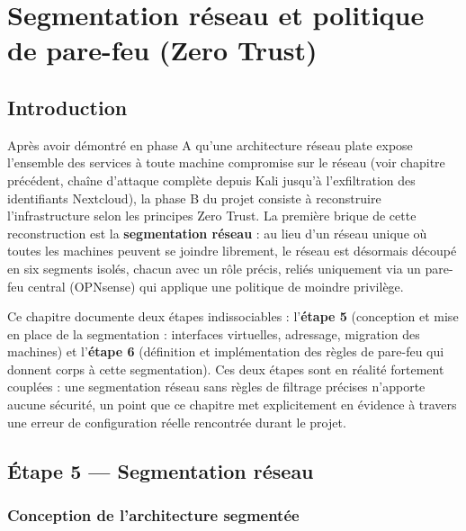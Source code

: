 
\chapter{Segmentation réseau et politique de pare-feu (Zero Trust)}

\section{Introduction}

Après avoir démontré en phase A qu'une architecture réseau plate expose
l'ensemble des services à toute machine compromise sur le réseau (voir
chapitre précédent, chaîne d'attaque complète depuis Kali jusqu'à
l'exfiltration des identifiants Nextcloud), la phase B du projet consiste
à reconstruire l'infrastructure selon les principes Zero Trust. La première
brique de cette reconstruction est la \textbf{segmentation réseau} : au lieu
d'un réseau unique où toutes les machines peuvent se joindre librement,
le réseau est désormais découpé en six segments isolés, chacun avec un rôle
précis, reliés uniquement via un pare-feu central (OPNsense) qui applique
une politique de moindre privilège.

Ce chapitre documente deux étapes indissociables : l'\textbf{étape 5}
(conception et mise en place de la segmentation : interfaces virtuelles,
adressage, migration des machines) et l'\textbf{étape 6} (définition et
implémentation des règles de pare-feu qui donnent corps à cette segmentation).
Ces deux étapes sont en réalité fortement couplées : une segmentation réseau
sans règles de filtrage précises n'apporte aucune sécurité, un point que ce
chapitre met explicitement en évidence à travers une erreur de configuration
réelle rencontrée durant le projet.

\section{Étape 5 — Segmentation réseau}

\subsection{Conception de l'architecture segmentée}

